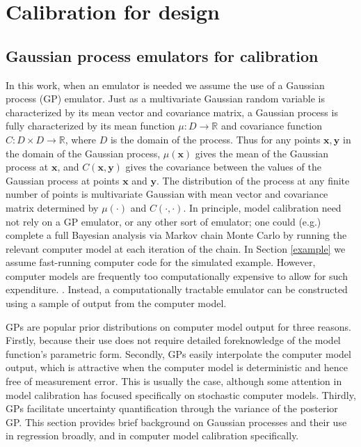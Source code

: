 \documentclass[12pt]{article}
\begin{document}
%
\section{Calibration for design}\label{calib_for_design}

%
\subsection{Gaussian process emulators for calibration}
%
In this work, when an emulator is needed we assume the use of a Gaussian process (GP) emulator.
%
Just as a multivariate Gaussian random variable is characterized by its mean vector and covariance matrix, a Gaussian process is fully characterized by its mean function $\mu:D\to \mathbb R$ and covariance function $C:D\times D\to \mathbb R$, where $D$ is the domain of the process. 
%
Thus for any points $\mathbf x,\mathbf y$ in the domain of the Gaussian process, $\mu(\mathbf x)$ gives the mean of the Gaussian process at $\mathbf x$, and $C(\mathbf x, \mathbf y)$ gives the covariance between the values of the Gaussian process at points $\mathbf x$ and $\mathbf y$.
%
The distribution of the process at any finite number of points is multivariate Gaussian with mean vector and covariance matrix determined by $\mu(\cdot)$ and $C(\cdot,\cdot)$.
%
In principle, model calibration need not rely on a GP emulator, or any other sort of emulator; one could (e.g.) complete a full Bayesian analysis via Markov chain Monte Carlo \citep[MCMC;][]{Gelfand1990} by running the relevant computer model at each iteration of the chain. 
%
In Section \ref{example} we assume fast-running computer code for the simulated example.
%
However, computer models are frequently too computationally expensive to allow for such expenditure. \citep{VanBuren2013,VanBuren2014}.
%
Instead, a computationally tractable emulator can be constructed using a sample of output from the computer model. 
%

%
GPs are popular prior distributions on computer model output for three reasons.
%
Firstly, because their use does not require detailed foreknowledge of the model function's parametric form. 
%
Secondly, GPs easily interpolate the computer model output, which is attractive when the computer model is deterministic and hence free of measurement error. 
%
This is usually the case, although some attention in model calibration \citep[e.g.,][]{Pratola2018} has focused specifically on stochastic computer models. 
%
Thirdly, GPs facilitate uncertainty quantification through the variance of the posterior GP. 
%
This section provides brief background on Gaussian processes and their use in regression broadly, and in computer model calibration specifically.
%
\end{document}
